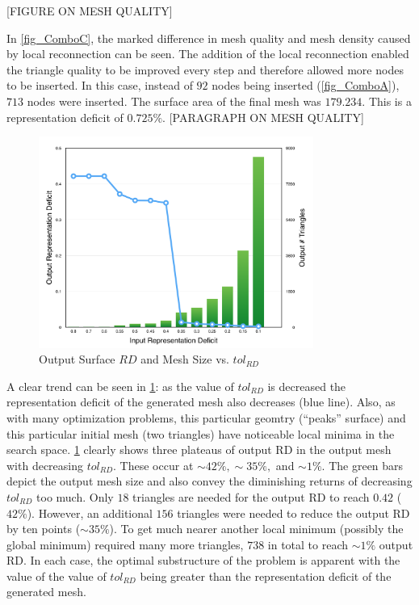 [FIGURE ON MESH QUALITY]

In \ref{fig_ComboC}, the marked difference in mesh quality and mesh
density caused by local reconnection can be seen.  The addition of the
local reconnection enabled the triangle quality to be improved every
step and therefore allowed more nodes to be inserted. In this case, 
instead of $92$ nodes being inserted (\ref{fig_ComboA}), $713$ nodes were
inserted. The surface area of the final mesh was $179.234$. This is a
representation deficit of $0.725\%$.
[PARAGRAPH ON MESH QUALITY]

\begin{figure}[h!]
  \begin{center}
  \includegraphics[width=90mm]{Figures/RDvsMeshSize.png}
  \caption{Output Surface $RD$ and Mesh Size vs. $tol_{RD}$}
  \label{fig_RDvsMeshSize}
  \end{center}
\end{figure}

A clear trend can be seen in \ref{fig_RDvsMeshSize}: as the value of
$tol_{RD}$ is decreased the representation deficit of the generated mesh
also decreases (blue line). Also, as with many optimization problems,
this particular geomtry (``peaks'' surface) and this particular initial
mesh (two triangles) have noticeable local minima in the search space.
\ref{fig_RDvsMeshSize} clearly shows three plateaus of output
RD in the output mesh with decreasing $tol_{RD}$.  These occur at
$\sim42\%, \sim35\%,$ and $\sim1\%$.  The green bars depict the output
mesh size and also convey the diminishing returns of decreasing
$tol_{RD}$ too much. Only $18$ triangles are needed for the output RD to
reach $0.42$ ($42\%$).  However, an additional $156$ triangles were
needed to reduce the output RD by ten points ($\sim 35\%$). To get much
nearer another local minimum (possibly the global minimum) required many
more triangles, $738$ in total to reach $\sim 1\%$ output RD. In each
case, the optimal substructure of the problem is apparent with the value
of the value of $tol_{RD}$ being greater than the representation deficit
of the generated mesh.
